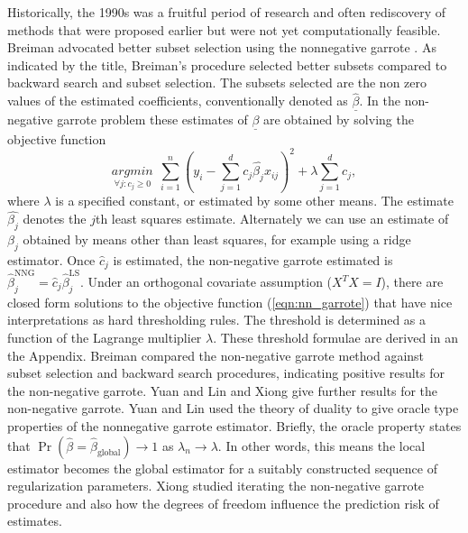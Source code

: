 Historically, the 1990s was a fruitful period of research and often rediscovery of methods that were proposed earlier but were not yet computationally feasible. Breiman advocated better subset selection using the nonnegative garrote \cite{breiman1995better,yuan2007non}. As indicated by the title, Breiman's procedure \cite{breiman1995better} selected better subsets compared to backward search and subset selection. The subsets selected are the non zero values of the estimated coefficients, conventionally denoted as $\underline{\hat{\beta}}$. In the non-negative garrote problem these estimates of $\underline{\beta}$ are obtained by solving the objective function 
\begin{equation}\label{eqn:nn_garrote}
\underset{\forall j: c_j\geq 0}{argmin}\ \ \sum_{i=1}^n(y_i -\sum_{j=1}^dc_j\hat{\beta_j}x_{ij})^2 + \lambda\sum_{j=1}^dc_j,
\end{equation}    
where $\lambda$ is a specified constant, or estimated by some other means. The estimate $\hat{\beta_j}$ denotes the $j$th least squares estimate. Alternately we can use an estimate of $\beta_j$ obtained by means other than least squares, for example using a ridge estimator. Once $\hat{c}_j$ is estimated, the non-negative garrote estimated is $\hat{\beta}_j^{\text{NNG}} =\hat{c}_j\hat{\beta}_j^{\text{LS}}$. Under an orthogonal covariate assumption ($X^TX=I$), there are closed form solutions to the objective function (\ref{eqn:nn_garrote}) that have nice interpretations as hard thresholding rules. The threshold is determined as a function of the Lagrange multiplier $\lambda$. These threshold formulae are derived in an the Appendix. 
Breiman compared the non-negative garrote method against subset selection and backward search procedures, indicating positive results for the non-negative garrote. Yuan and Lin \cite{yuan2007non} and Xiong \cite{xiong2010some} give further results for the non-negative garrote. Yuan and Lin used the theory of duality to give oracle type properties of the nonnegative garrote estimator. Briefly, the oracle property states that $\Pr(\hat{\beta} = \hat{\beta}_{\text{global}})\to 1$ as $\lambda_n\to\lambda$. In other words, this means the local estimator becomes the global estimator for a suitably constructed sequence of regularization parameters. Xiong studied iterating the non-negative garrote procedure and also how the degrees of freedom influence the prediction risk of estimates.    

